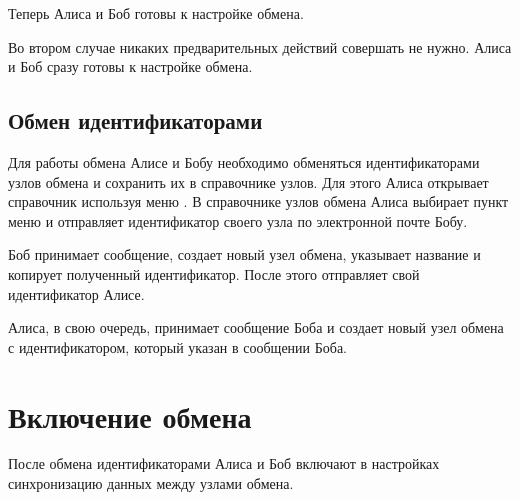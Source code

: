 \documentclass[a4paper,10pt,russian]{sphinxmanual}
\begin{document}
Теперь Алиса и Боб готовы к настройке обмена.

Во втором случае никаких предварительных действий совершать не нужно. Алиса и Боб сразу готовы к настройке обмена.


\subsection{Обмен идентификаторами}
\label{\detokenize{teamwork:id5}}
Для работы обмена Алисе и Бобу необходимо обменяться идентификаторами узлов обмена и сохранить их в справочнике узлов.
Для этого Алиса открывает справочник  используя меню . В справочнике
узлов обмена Алиса выбирает пункт меню  и отправляет идентификатор своего узла
по электронной почте Бобу.

\noindent{}
\noindent{}
\noindent{}
\noindent{}
\noindent{}
\noindent{}

Боб принимает сообщение, создает новый узел обмена, указывает название и копирует полученный идентификатор. После этого отправляет свой идентификатор Алисе.

\noindent{}
\noindent{}
\noindent{}
\noindent{}
\noindent{}

Алиса, в свою очередь, принимает сообщение Боба и создает новый узел обмена с идентификатором, который указан в сообщении Боба.


\section{Включение обмена}
\label{\detokenize{teamwork:id6}}
После обмена идентификаторами Алиса и Боб включают в настройках синхронизацию данных между узлами обмена.
\end{document}
